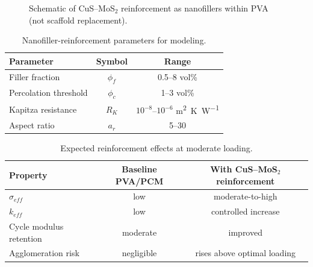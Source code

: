 \begin{figure}[htbp]
\centering
{}
\caption{Schematic of CuS--MoS$_2$ reinforcement as nanofillers within PVA (not scaffold replacement).}
\label{fig:cusmos2_dispersion}
\end{figure}

\begin{table}[htbp]
\centering
\caption{Nanofiller-reinforcement parameters for modeling.}
\label{tab:cusmos2_params}
\begin{tabular}{lcc}
\toprule
Parameter & Symbol & Range \\
\midrule
Filler fraction & $\phi_f$ & 0.5--8 vol\% \\
Percolation threshold & $\phi_c$ & 1--3 vol\% \\
Kapitza resistance & $R_K$ & $10^{-8}$--$10^{-6}$ \si{\meter\squared\kelvin\per\watt} \\
Aspect ratio & $a_r$ & 5--30 \\
\bottomrule
\end{tabular}
\end{table}

\begin{table}[htbp]
\centering
\caption{Expected reinforcement effects at moderate loading.}
\label{tab:cusmos2_effects}
\begin{tabular}{lcc}
\toprule
Property & Baseline PVA/PCM & With CuS--MoS$_2$ reinforcement \\
\midrule
$\sigma_{eff}$ & low & moderate-to-high \\
$k_{eff}$ & low & controlled increase \\
Cycle modulus retention & moderate & improved \\
Agglomeration risk & negligible & rises above optimal loading \\
\bottomrule
\end{tabular}
\end{table}

